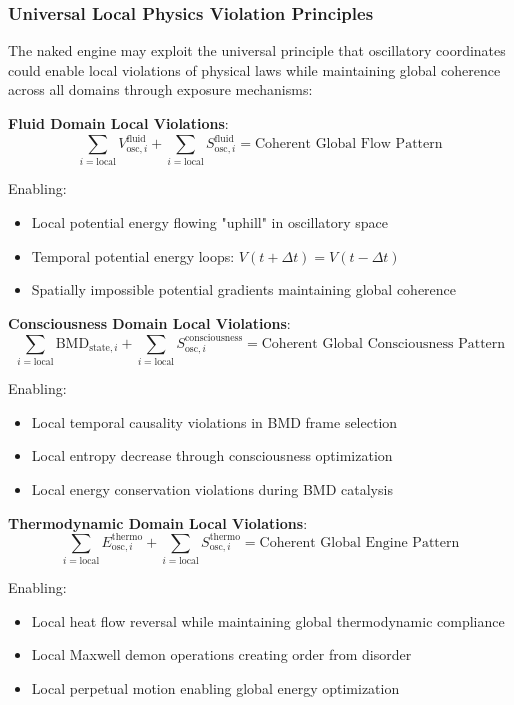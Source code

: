 \documentclass[11pt,a4paper]{article}
\theoremstyle{remark}
\begin{document}
\subsubsection{Universal Local Physics Violation Principles}

The naked engine may exploit the universal principle that oscillatory coordinates could enable local violations of physical laws while maintaining global coherence across all domains through exposure mechanisms:

\textbf{Fluid Domain Local Violations}:
$$\sum_{i=\text{local}} V_{\text{osc},i}^{\text{fluid}} + \sum_{i=\text{local}} S_{\text{osc},i}^{\text{fluid}} = \text{Coherent Global Flow Pattern}$$

Enabling:
\begin{itemize}
\item Local potential energy flowing "uphill" in oscillatory space
\item Temporal potential energy loops: $V(t+\Delta t) = V(t-\Delta t)$
\item Spatially impossible potential gradients maintaining global coherence
\end{itemize}

\textbf{Consciousness Domain Local Violations}:
$$\sum_{i=\text{local}} \text{BMD}_{\text{state},i} + \sum_{i=\text{local}} S_{\text{osc},i}^{\text{consciousness}} = \text{Coherent Global Consciousness Pattern}$$

Enabling:
\begin{itemize}
\item Local temporal causality violations in BMD frame selection
\item Local entropy decrease through consciousness optimization
\item Local energy conservation violations during BMD catalysis
\end{itemize}

\textbf{Thermodynamic Domain Local Violations}:
$$\sum_{i=\text{local}} E_{\text{osc},i}^{\text{thermo}} + \sum_{i=\text{local}} S_{\text{osc},i}^{\text{thermo}} = \text{Coherent Global Engine Pattern}$$

Enabling:
\begin{itemize}
\item Local heat flow reversal while maintaining global thermodynamic compliance
\item Local Maxwell demon operations creating order from disorder
\item Local perpetual motion enabling global energy optimization
\end{itemize}
\end{document}
